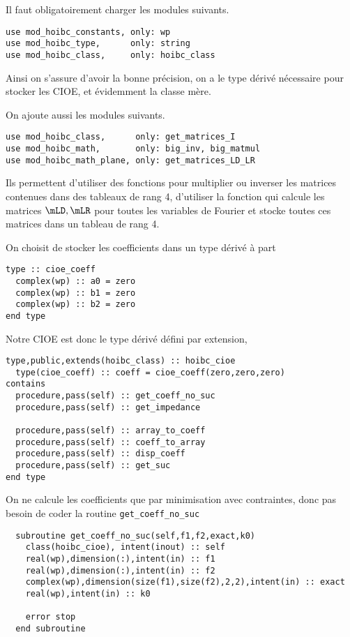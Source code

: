     Il faut obligatoirement charger les modules suivants.
\begin{lstlisting}
use mod_hoibc_constants, only: wp
use mod_hoibc_type,      only: string
use mod_hoibc_class,     only: hoibc_class
\end{lstlisting}
    Ainsi on s'assure d'avoir la bonne précision, on a le type dérivé nécessaire pour stocker les CIOE, et évidemment la classe mère.

    On ajoute aussi les modules suivants.
\begin{lstlisting}
use mod_hoibc_class,      only: get_matrices_I
use mod_hoibc_math,       only: big_inv, big_matmul
use mod_hoibc_math_plane, only: get_matrices_LD_LR
\end{lstlisting}
    Ils permettent d'utiliser des fonctions pour multiplier ou inverser les matrices contenues dans des tableaux de rang 4, d'utiliser la fonction qui calcule les matrices \(\mLD,\mLR\) pour toutes les variables de Fourier et stocke toutes ces matrices dans un tableau de rang 4.

    On choisit de stocker les coefficients dans un type dérivé à part
\begin{lstlisting}
type :: cioe_coeff
  complex(wp) :: a0 = zero
  complex(wp) :: b1 = zero
  complex(wp) :: b2 = zero
end type
\end{lstlisting}

    Notre CIOE est donc le type dérivé défini par extension,
\begin{lstlisting}
type,public,extends(hoibc_class) :: hoibc_cioe
  type(cioe_coeff) :: coeff = cioe_coeff(zero,zero,zero)
contains
  procedure,pass(self) :: get_coeff_no_suc
  procedure,pass(self) :: get_impedance

  procedure,pass(self) :: array_to_coeff
  procedure,pass(self) :: coeff_to_array
  procedure,pass(self) :: disp_coeff
  procedure,pass(self) :: get_suc
end type
\end{lstlisting}

    On ne calcule les coefficients que par minimisation avec contraintes, donc pas besoin de coder la routine \lstinline{get_coeff_no_suc}
\begin{lstlisting}
  subroutine get_coeff_no_suc(self,f1,f2,exact,k0)
    class(hoibc_cioe), intent(inout) :: self
    real(wp),dimension(:),intent(in) :: f1
    real(wp),dimension(:),intent(in) :: f2
    complex(wp),dimension(size(f1),size(f2),2,2),intent(in) :: exact
    real(wp),intent(in) :: k0

    error stop
  end subroutine
\end{lstlisting}


